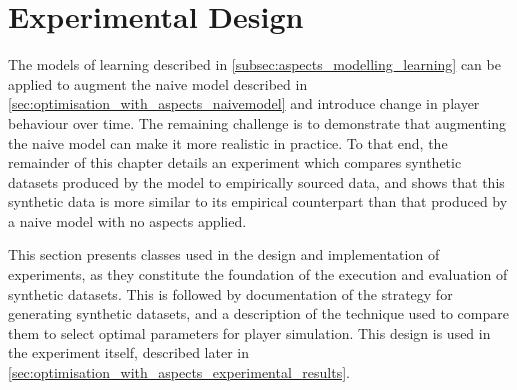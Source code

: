 




\section{Experimental Design}
\label{sec:optimisation_with_aspects_experimental_design}

The models of learning described in \cref{subsec:aspects_modelling_learning} can
be applied to augment the naive model described in
\cref{sec:optimisation_with_aspects_naivemodel} and introduce change in player
behaviour over time. The remaining challenge is to demonstrate that augmenting
the naive model can make it more realistic in practice. To that end, the
remainder of this chapter details an experiment which compares synthetic
datasets produced by the model to empirically sourced data, and shows that this
synthetic data is more similar to its empirical counterpart than that produced
by a naive model with no aspects applied.

This section presents classes used in the design and implementation of
experiments, as they constitute the foundation of the execution and evaluation
of synthetic datasets. This is followed by documentation of the strategy for
generating synthetic datasets, and a description of the technique used to
compare them to select optimal parameters for player simulation. This design is
used in the experiment itself, described later in
\cref{sec:optimisation_with_aspects_experimental_results}.


